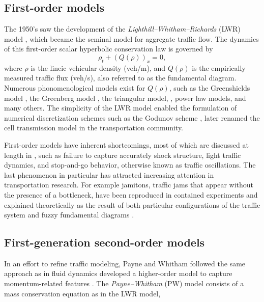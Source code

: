 \documentclass[preprint]{elsarticle}
\begin{document}
\subsection{First-order models}
The 1950's saw the development of the \textit{Lighthill--Whitham--Richards}
(LWR) model \cite{LW,Richards}, which became the seminal model for aggregate
traffic flow. The dynamics of this first-order scalar hyperbolic conservation law is governed by
\begin{equation}
\rho_t+\left(Q\left(\rho\right)\right)_x=0,
\end{equation}
where $\rho$ is the lineic vehicular density (veh/m), and $Q(\rho)$ is the empirically measured traffic flux (veh/s), also referred to as the fundamental diagram. Numerous phonomenological models exist for $Q(\rho)$,  such as the Greenshields model \cite{Greenshieldsflux}, the Greenberg model \cite{Greenbergflux}, the triangular model, \cite{Newell1993, daganzo1994cell}, power law models, \cite{Wang2005141, Papageorgiou198929} and many others. The simplicity of the LWR model enabled the formulation of numerical discretization
schemes such as the Godunov scheme \cite{godunov,Osher}, later renamed the cell transmission
model \cite{daganzo1994cell,daganzo1995cell} in the transportation community. 

First-order models have inherent shortcomings, most of which are discussed at length in \cite{Dag_requiem}, such as failure to capture accurately shock structure, light traffic dynamics, and stop-and-go behavior, otherwise known as traffic oscillations. The last phenomenon in particular has attracted increasing attention in transportation research. For example jamitons, traffic jams that appear without the presence of a bottleneck, have been reproduced in contained experiments \cite{Jamitons2008,Flynn08onjamitons} and explained theoretically
as the result of both particular configurations of the traffic system
\cite{Flynn09self-sustainednonlinear} and
fuzzy fundamental diagrams \cite{Jamitons-multi-valued-fund}. 


\subsection{First-generation second-order models}
In an effort to refine traffic modeling, Payne and Whitham followed the same approach as in fluid dynamics developed a higher-order model to capture momentum-related features \cite{payne1971models,whitham1974linear}. The \textit{Payne--Whitham} (PW) model consists of a mass conservation equation as in the LWR model,  
\end{document}
